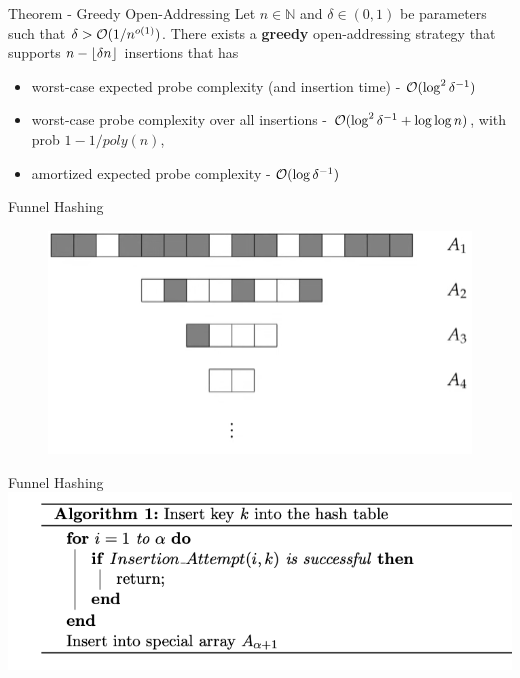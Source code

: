 \documentclass{beamer}
\begin{document}
\begin{frame}
	\begin{block}{Theorem - Greedy Open-Addressing}
		Let $n \in \mathbb{N}$ and $\delta \in(0, 1)$ be parameters such that $\delta > 
		{\cal O}(1/n^{o(1)})$.
			 There exists a { \bf greedy} open-addressing strategy that supports $n - \left\lfloor \delta n \right\rfloor$ insertions that has 
			\begin{itemize}
				\item worst-case expected probe complexity (and insertion time) - ${\cal O}(\log^2{\delta^{-1}} )$ 
				\item worst-case probe complexity over all insertions - ${\cal O}(\log^2{\delta^{-1}} + \log{\log{n}})$, with prob $1- 1/poly(n)$, 
				\item amortized expected probe complexity - ${\cal O}(\log{\delta^{-1}})$
			\end{itemize}
		
	\end{block}
\end{frame}

\begin{frame}{Funnel Hashing}
	\begin{figure}
		\includegraphics[scale=0.5]{funnel_hash.png}
	\end{figure}
\end{frame}

\begin{frame}{Funnel Hashing}
	\includegraphics{insert}
\end{frame}
\end{document}

